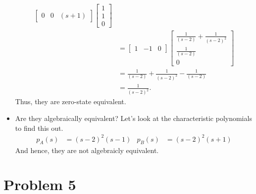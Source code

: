 \documentclass[10pt]{article}
\begin{document}
\begin{itemize}
\begin{equation}
\begin{split}
\begin{bmatrix}
      0 & 0& (s+1)
    \end{bmatrix}
    \begin{bmatrix}
      1 \\ 1 \\ 0
    \end{bmatrix}\\
    &= 
    \begin{bmatrix}
      1 & -1 & 0
    \end{bmatrix}
    \begin{bmatrix}
      \frac{1}{(s-2)} +  \frac{1}{(s-2)^2}\\
       \frac{1}{(s-2)} \\
      0 
    \end{bmatrix}\\
    &=      \frac{1}{(s-2)} +  \frac{1}{(s-2)^2}-
       \frac{1}{(s-2)} \\
    &=  \frac{1}{(s-2)^2}.
  \end{split}
\end{equation}
Thus, they are zero-state equivalent.
\item  Are they algebraically equivalent?
Let's look at the characteristic polynomials to find this out.
\begin{align*}
  p_A(s) &=(s-2)^2(s-1) &p_B(s) &=(s-2)^2(s+1)
\end{align*}
And hence, they are not algebraicly equivalent.
\end{itemize}

\section{Problem 5}
\end{document}
